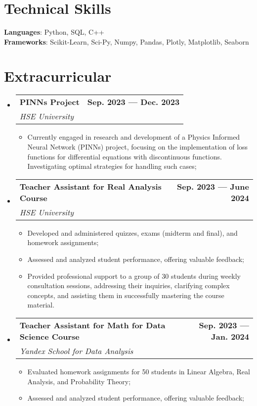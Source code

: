 \documentclass[letterpaper,11pt]{article}
\makeatletter
\newcommand{\resumeItem}[1]{
  \item\small{
    {#1 \vspace{-2pt}}
  }
}
\newcommand{\resumeSubheading}[4]{
  \vspace{-2pt}\item
    \begin{tabular*}{1.0\textwidth}[t]{l@{\extracolsep{\fill}}r}
      \textbf{#1} & \textbf{\small #2} \\
      \textit{\small#3} & \textit{\small #4} \\
    \end{tabular*}\vspace{-7pt}
}
\newcommand{\resumeSubHeadingListStart}{\begin{itemize}[leftmargin=0.0in, label={}]}
\newcommand{\resumeSubHeadingListEnd}{\end{itemize}}
\newcommand{\resumeItemListStart}{\begin{itemize}}
\newcommand{\resumeItemListEnd}{\end{itemize}\vspace{-5pt}}
\makeatother
\begin{document}
%
\section{Technical Skills}
 \begin{itemize}[leftmargin=0.15in, label={}]
    \small{\item{
     \textbf{Languages}{: Python, SQL, C++} \\
     \textbf{Frameworks}{: Scikit-Learn, Sci-Py, Numpy, Pandas, Plotly, Matplotlib, Seaborn} \\
    }}
 \end{itemize}
 \vspace{-16pt}


\section{Extracurricular}
    \resumeSubHeadingListStart
        \resumeSubheading{PINNs Project}{Sep. 2023 --- Dec. 2023}{HSE University}{}
            \resumeItemListStart
                \resumeItem{Currently engaged in research and development of a Physics Informed Neural Network (PINNs) project, focusing on the implementation of loss functions for differential equations with discontinuous functions. Investigating optimal strategies for handling such cases;}
            \resumeItemListEnd

        \resumeSubheading{Teacher Assistant for Real Analysis Course}{Sep. 2023 --- June 2024}{HSE University}{}
            \resumeItemListStart
                \resumeItem{Developed and administered quizzes, exams (midterm and final), and homework assignments;}
                \resumeItem{Assessed and analyzed student performance, offering valuable feedback;}
                \resumeItem{Provided professional support to a group of 30 students during weekly consultation sessions, addressing their inquiries, clarifying complex concepts, and assisting them in successfully mastering the course material.}
            \resumeItemListEnd

        \resumeSubheading{Teacher Assistant for Math for Data Science Course}{Sep. 2023 --- Jan. 2024}{Yandex School for Data Analysis }{}
            \resumeItemListStart
                \resumeItem{Evaluated homework assignments for 50 students in Linear Algebra, Real Analysis, and Probability Theory;}
                \resumeItem{Assessed and analyzed student performance, offering valuable feedback;}
            \resumeItemListEnd
    \resumeSubHeadingListEnd
\end{document}
